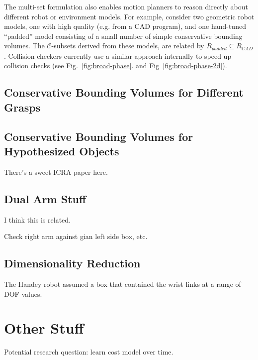 The multi-set formulation also enables motion planners to
reason directly about different robot or environment models.
For example, consider two geometric robot models,
one with high quality (e.g. from a CAD program),
and one hand-tuned ``padded'' model consisting of 
a small number of simple conservative bounding volumes.
The $\mathcal{C}$-subsets derived from these models,
are related by $R_{padded} \subseteq R_{CAD}$.
Collision checkers currently use a similar approach internally
to speed up collision checks (see Fig.~\ref{fig:broad-phase}.
and Fig~\ref{fig:broad-phase-2d}).

\subsection{Conservative Bounding Volumes for Different Grasps}

\subsection{Conservative Bounding Volumes for Hypothesized Objects}

There's a sweet ICRA paper here.

\subsection{Dual Arm Stuff}

I think this is related.

Check right arm against gian left side box, etc.

\subsection{Dimensionality Reduction}

The Handey \cite{lozanoperez1987handey} robot
assumed a box that contained the wrist links at a range of DOF values.

\section{Other Stuff}

Potential research question: learn cost model over time.
